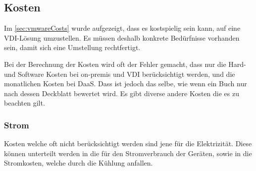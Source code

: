\subsection{Kosten}

Im \cref{sec:vmwareCosts} wurde aufgezeigt, dass es kostspielig sein kann, auf eine VDI-Lösung umzustellen. Es müssen deshalb konkrete Bedürfnisse vorhanden sein, damit sich eine Umstellung rechtfertigt.

Bei der Berechnung der Kosten wird oft der Fehler gemacht, dass nur die Hard- und Software Kosten bei on-premis und VDI berücksichtigt werden, und die monatlichen Kosten bei DaaS.
Dass ist jedoch das selbe, wie wenn ein Buch nur nach dessen Deckblatt bewertet wird.
Es gibt diverse andere Kosten die es zu beachten gilt.

\subsubsection{Strom}
Kosten welche oft nicht berücksichtigt werden sind jene für die Elektrizität.
Diese können unterteilt werden in die für den Stromverbrauch der Geräten, sowie in die Stromkosten, welche durch die Kühlung anfallen.

